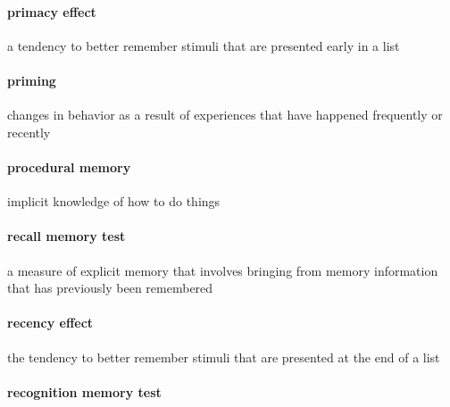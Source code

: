 \documentclass[
]{krantz}
\begin{document}
\hypertarget{primacy-effect}{%
\paragraph*{primacy effect}\label{primacy-effect}}

a tendency to better remember stimuli that are presented early in a list

\hypertarget{priming}{%
\paragraph*{priming}\label{priming}}

changes in behavior as a result of experiences that have happened frequently or recently

\hypertarget{procedural-memory}{%
\paragraph*{procedural memory}\label{procedural-memory}}

implicit knowledge of how to do things

\hypertarget{recall-memory-test}{%
\paragraph*{recall memory test}\label{recall-memory-test}}

a measure of explicit memory that involves bringing from memory information that has previously been remembered

\hypertarget{recency-effect}{%
\paragraph*{recency effect}\label{recency-effect}}

the tendency to better remember stimuli that are presented at the end of a list

\hypertarget{recognition-memory-test}{%
\paragraph*{recognition memory test}\label{recognition-memory-test}}
\end{document}

